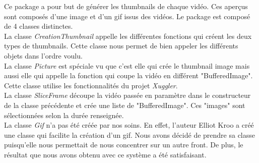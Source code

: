 Ce package a pour but de générer les thumbnails de chaque vidéo. Ces aperçus sont composés d'une image et d'un gif issus des vidéos. Le package est composé de 4 classes distinctes.\\
La classe \textit{CreationThumbnail} appelle les différentes fonctions qui créent les deux types de thumbnails. Cette classe nous permet de bien appeler les différents objets dans l'ordre voulu.\\
La classe \textit{Picture} est spéciale vu que c'est elle qui crée le thumbnail image mais aussi elle qui appelle la fonction qui coupe la vidéo en différent "BufferedImage". Cette classe utilise les fonctionnalités du projet \textit{Xuggler}.\\
La classe \textit{SliceFrame} découpe la vidéo passée en paramètre dans le constructeur de la classe précédente et crée une liste de "BufferedImage". Ces "images" sont sélectionnées selon la durée renseignée.\\
La classe \textit{Gif} n'a pas été créée par nos soins. En effet, l'auteur Elliot Kroo a créé une classe qui facilite la création d'un gif. Nous avons décidé de prendre sa classe puisqu'elle nous permettait de nous concentrer sur un autre front. De plus, le résultat que nous avons obtenu avec ce système a été satisfaisant.